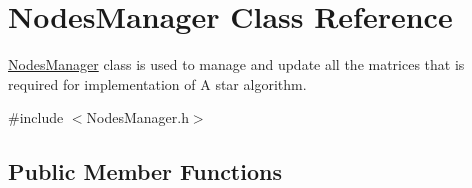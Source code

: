 \hypertarget{classNodesManager}{}\section{Nodes\+Manager Class Reference}
\label{classNodesManager}


\hyperlink{classNodesManager}{Nodes\+Manager} class is used to manage and update all the matrices that is required for implementation of A star algorithm.  




{\ttfamily \#include $<$Nodes\+Manager.\+h$>$}

\subsection*{Public Member Functions}
